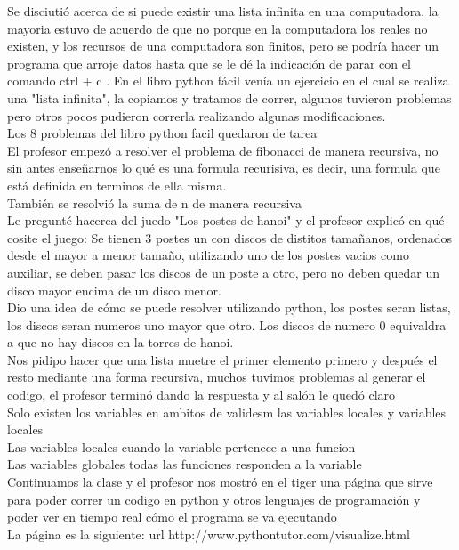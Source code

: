 \documentclass{book}
\begin{document}
\begin{enumerate}
\begin{enumerate}
Se disciutió acerca de si puede existir una lista infinita en una computadora, la mayoria estuvo de acuerdo de que no porque en la computadora los reales no existen, y los recursos de una computadora son finitos, pero se podría hacer un programa que arroje datos hasta que se le dé la indicación de parar con el comando \color{blue}ctrl + c \color{black}. En el libro python fácil venía un ejercicio en el cual se realiza una "lista infinita", la copiamos y tratamos de correr, algunos tuvieron problemas pero otros pocos pudieron correrla realizando algunas modificaciones.\\
Los 8 problemas del libro python facil quedaron de tarea\\
El profesor empezó a resolver el problema de fibonacci de manera recursiva, no sin antes enseñarnos lo qué es una formula recurisiva, es decir, una formula que está definida en terminos de ella misma.\\
También se resolvió la suma de n de manera recursiva \\
Le pregunté hacerca del juedo "Los postes de hanoi" y el profesor explicó en qué cosite el juego: Se tienen 3 postes un con discos de distitos tamañanos, ordenados desde el mayor a menor tamaño, utilizando uno de los postes vacios como auxiliar, se deben pasar los discos de un poste a otro, pero no deben quedar un disco mayor encima de un disco menor. \\
Dio una idea de cómo se puede resolver utilizando python, los postes seran listas, los discos seran numeros uno mayor que otro. Los discos de numero 0 equivaldra a que no hay discos en la torres de hanoi.\\
Nos pidipo hacer que una lista muetre el primer elemento primero y después el resto mediante una forma recursiva, muchos tuvimos problemas al generar el codigo, el profesor terminó dando la respuesta y al salón le quedó claro\\

Solo existen los variables en ambitos de validesm las variables locales y variables locales\\
Las variables locales cuando la variable pertenece a una funcion\\
Las variables globales todas las funciones responden a la variable\\
Continuamos la clase y el profesor nos mostró en el tiger una página que sirve para poder correr un codigo en python  y otros lenguajes de programación y poder ver en tiempo real cómo el programa se va ejecutando\\
La página es la siguiente: url http://www.pythontutor.com/visualize.html


\end{enumerate}
\end{enumerate}
\end{document}
